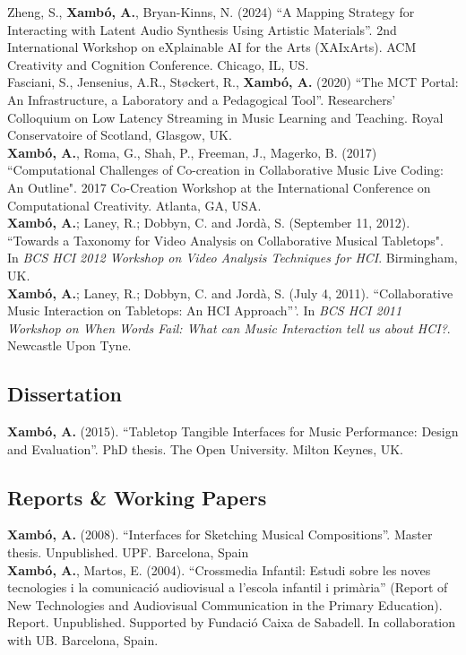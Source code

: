 \documentclass[10pt, a4paper]{article}
\newcommand{\years}[1]{\marginnote{\scriptsize #1}}
\begin{document}
{\years{2024} Zheng, S., \textbf{Xambó, A.}, Bryan-Kinns, N. (2024) ``A Mapping Strategy for Interacting with Latent Audio Synthesis Using Artistic Materials''. 2nd International Workshop on eXplainable AI for the Arts (XAIxArts). ACM Creativity and Cognition Conference. Chicago, IL, US.\\
\years{2020}Fasciani, S., Jensenius, A.R., Støckert, R., \textbf{Xambó, A.} (2020) ``The MCT Portal: An Infrastructure, a Laboratory and a Pedagogical Tool''. Researchers’ Colloquium on Low Latency Streaming in Music Learning and Teaching. Royal Conservatoire of Scotland, Glasgow, UK.\\
\years{2017}\textbf{Xambó, A.}, Roma, G., Shah, P., Freeman, J., Magerko, B. (2017) “Computational Challenges of Co-creation in Collaborative Music Live Coding: An Outline". 2017 Co-Creation Workshop at the International Conference on Computational Creativity. Atlanta, GA, USA.\\ 
\years{2012}\textbf{Xambó, A.}; Laney, R.; Dobbyn, C. and Jordà, S. (September 11, 2012). “Towards a Taxonomy for Video Analysis on Collaborative Musical Tabletops". In \emph{BCS HCI 2012 Workshop on Video Analysis Techniques for HCI}. Birmingham, UK.\\
\years{2011}\textbf{Xambó, A.}; Laney, R.; Dobbyn, C. and Jordà, S. (July 4, 2011). ``Collaborative Music Interaction on Tabletops: An HCI Approach'''. In \emph{BCS HCI 2011 Workshop on When Words Fail: What can Music Interaction tell us about HCI?}. Newcastle Upon Tyne.

\subsection*{Dissertation}
\noindent

\years{2015}\textbf{Xambó, A.} (2015). ``Tabletop Tangible Interfaces for Music Performance: Design and Evaluation''. PhD thesis. The Open University. Milton Keynes, UK.

\subsection*{Reports \& Working Papers}
\noindent

\years{2008}\textbf{Xambó, A.} (2008). ``Interfaces for Sketching Musical Compositions''. Master thesis. Unpublished. UPF. Barcelona, Spain\\ 
\years{2004}\textbf{Xambó, A.}, Martos, E. (2004). ``Crossmedia Infantil: Estudi sobre les noves tecnologies i la comunicació audiovisual a l'escola infantil i primària'' (Report of New Technologies and Audiovisual Communication in the Primary Education). Report. Unpublished. Supported by Fundació Caixa de Sabadell. In collaboration with UB. Barcelona, Spain.

}
\end{document}
